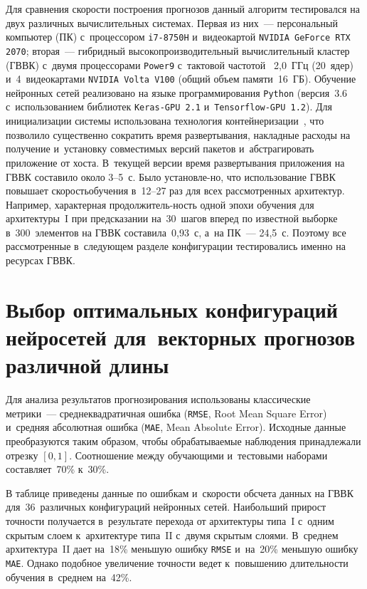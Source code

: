 \begin{multicols}{2}
Для сравнения скорости построения прогнозов данный алгоритм 
тестировался на двух различных вычислительных системах. Первая из них~--- 
персональный компьютер (ПК) с~процессором \verb"i7-8750H" и~видеокартой 
\verb"NVIDIA GeForce RTX 2070"; вторая~--- гибридный высокопроизводительный 
вычислительный кластер (ГВВК) с~двумя процессорами \verb"Power9" с~тактовой 
частотой ~2{,}0~ГГц (20~ядер) и~4~видеокартами \verb"NVIDIA Volta V100" 
(общий объем памяти~16~ГБ). Обучение нейронных сетей реализовано на 
языке программирования \verb"Python" (версия~3.6 с~использованием библиотек
 \verb"Keras-GPU 2.1" и~\verb"Tensorflow-GPU 1.2"). 
 Для инициализации системы использована технология 
 контейнеризации~\cite{Peinl2016}, что позволило существенно 
 сократить время развертывания, накладные расходы на получение и~установку 
 совместимых версий пакетов и~абстрагировать приложение от хоста. 
 В~текущей версии время развертывания приложения на \mbox{ГВВК} составило около 
 3--5~с. Было установле-\linebreak но, что использование \mbox{ГВВК} повышает 
 скорость\linebreak обучения 
 в~12--27 раз для всех рассмотренных архитектур. Например, характерная 
 продолжитель-\linebreak ность одной эпохи обучения для архитектуры~I при предсказании на~30~шагов 
 вперед по известной выборке в~300~элементов на \mbox{ГВВК} составила~0{,}93~с, 
 а~на ПК~--- 24{,}5~с. Поэтому все рассмотренные в~сле\-ду\-ющем разделе 
 конфигурации тестировались именно на ресурсах \mbox{ГВВК}.
 { %

}


\section{Выбор оптимальных конфигураций нейросетей для~векторных 
прогнозов различной длины}

Для анализа результатов прогнозирования использованы классические метрики~--- 
сред\-не\-квад\-ра\-тич\-ная ошибка (\verb"RMSE", Root Mean Square Error) и~средняя 
абсолютная ошибка (\verb"MAE", Mean Absolute Error). Исходные данные 
преобразуются таким образом, чтобы обрабатываемые наблюдения принадлежали 
отрезку $[0, 1]$. Соотношение между обуча\-ющи\-ми и~тестовыми наборами 
составляет~70\% к~30\%.

В таблице приведены данные по ошибкам и~скорости обсчета 
данных на ГВВК для~36~различных конфигураций нейронных сетей. 
Наибольший прирост точности получается в~результате перехода от 
архитектуры типа~I с~одним скрытым слоем к~архитектуре типа~II 
с~двумя скрытым слоями. В~среднем архитектура~II дает на~18\% 
меньшую ошибку \verb"RMSE" и~на~20\% меньшую ошибку \verb"MAE". 
Однако подобное увеличение точности ведет к~повышению длительности 
обучения в~среднем на~42\%.




\end{multicols}
